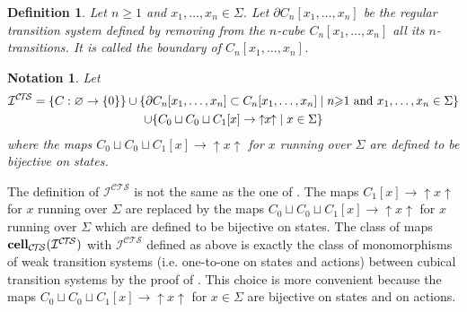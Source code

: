 \documentclass[a4paper,12pt]{amsart}
\newtheorem{defn}[thm]{Definition}
\newtheorem{nota}[thm]{Notation}
\begin{document}
\begin{defn} \label{boundary-def} Let $n{\geqslant} 1$ and $x_1,\dots,x_n \in
\Sigma$. Let ${\partial} C_n[x_1,\dots,x_n]$ be the regular transition system
defined by removing from the $n$-cube $C_n[x_1,\dots,x_n]$ all its
$n$-transitions. It is called the {\rm boundary} of
$C_n[x_1,\dots,x_n]$. \end{defn}

\begin{nota} \label{fix}
  Let \begin{multline*}
{\mathcal{I}}^{\mathcal{C\!T\!S}} = \{C:\varnothing \to \{0\}\} \cup \{{\partial}
  C_n[x_1,\dots,x_n] \subset C_n[x_1,\dots,x_n]\mid \hbox{$n{\geqslant} 1$
    and $x_1,\dots,x_n \in \Sigma$}\} \\\cup \{C_0 \sqcup C_0 \sqcup
  C_1[x] \to {\uparrow\!\!{{x}}\!\!\uparrow}\mid x\in \Sigma\}
\end{multline*}
where the maps $C_0 \sqcup C_0 \sqcup C_1[x] \to {\uparrow\!\!{{x}}\!\!\uparrow}$ for $x$
running over $\Sigma$ are defined to be bijective on states.
\end{nota}

The definition of ${\mathcal{I}}^{\mathcal{C\!T\!S}}$ is not the same as the one of
\cite{biscsts1}. The maps $C_1[x]\to {\uparrow\!\!{{x}}\!\!\uparrow}$ for $x$ running over
$\Sigma$ are replaced by the maps $C_0 \sqcup C_0 \sqcup C_1[x] \to
{\uparrow\!\!{{x}}\!\!\uparrow}$ for $x$ running over $\Sigma$ which are defined to be
bijective on states. The class of maps $\operatorname{{{\rm{\mathbf{{cell}}}}}}_{\mathcal{C\!T\!S}}({\mathcal{I}}^{\mathcal{C\!T\!S}})$ with
${\mathcal{I}}^{\mathcal{C\!T\!S}}$ defined as above is exactly the class of monomorphisms of
weak transition systems (i.e. one-to-one on states and actions)
between cubical transition systems by the proof of
\cite[Theorem~4.6]{homotopyprecubical}. This choice is more convenient
because the maps $C_0 \sqcup C_0 \sqcup C_1[x]\to {\uparrow\!\!{{x}}\!\!\uparrow}$ for $x\in
\Sigma$ are bijective on states and on actions. 
\end{document}
